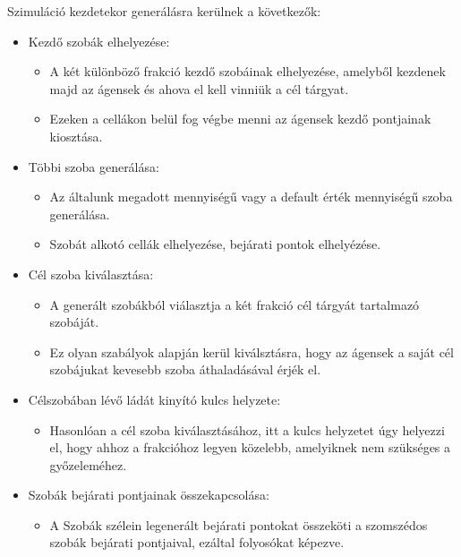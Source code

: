 Szimuláció kezdetekor generálásra kerülnek a következők: 

\begin{itemize}
    \item Kezdő szobák elhelyezése:
    
    \begin{itemize}
        \item A két különböző frakció kezdő szobáinak elhelyezése, amelyből kezdenek majd az ágensek és ahova el kell vinniük a cél tárgyat.
        \item Ezeken a cellákon belül fog végbe menni az ágensek kezdő pontjainak kiosztása.
    \end{itemize}

    \item Többi szoba generálása:
    
    \begin{itemize}
        \item Az általunk megadott mennyiségű vagy a default érték mennyiségű szoba generálása.
        \item Szobát alkotó cellák elhelyezése, bejárati pontok elhelyézése.
    \end{itemize}

    \item Cél szoba kiválasztása:
    
    \begin{itemize}
        \item A generált szobákból viálasztja a két frakció cél tárgyát tartalmazó szobáját.
        \item Ez olyan szabályok alapján kerül kiválsztásra, hogy az ágensek a saját cél szobájukat kevesebb szoba áthaladásával érjék el.
    \end{itemize}

    \item Célszobában lévő ládát kinyító kulcs helyzete:
    
    \begin{itemize}
        \item Hasonlóan a cél szoba kiválasztásához, itt a kulcs helyzetet úgy helyezzi el, hogy ahhoz a frakcióhoz legyen közelebb, amelyiknek nem szükséges a győzeleméhez.
    \end{itemize}

    \item Szobák bejárati pontjainak összekapcsolása:
    
    \begin{itemize}
        \item A Szobák szélein legenerált bejárati pontokat összeköti a szomszédos szobák bejárati pontjaival, ezáltal folyosókat képezve.
    \end{itemize}


\end{itemize}
